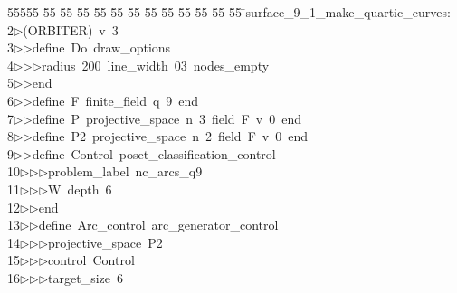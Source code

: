 %
%
\begin{tabbing}
55555 \= 55 \= 55 \= 55 \= 55 \= 55 \= 55 \= 55 \= 55 \= 55 \= 55 \= 55 \= 55 \= \>surface\_9\_1\_make\_quartic\_curves:\\[0pt]
2\>$\triangleright$\>(ORBITER)\ v\ 3\ \\[0pt]
3\>$\triangleright$\>$\triangleright$\>define\ Do\ draw\_options\ \\[0pt]
4\>$\triangleright$\>$\triangleright$\>$\triangleright$\>radius\ 200\ line\_width\ 03\ nodes\_empty\ \\[0pt]
5\>$\triangleright$\>$\triangleright$\>end\ \\[0pt]
6\>$\triangleright$\>$\triangleright$\>define\ F\ finite\_field\ q\ 9\ end\ \\[0pt]
7\>$\triangleright$\>$\triangleright$\>define\ P\ projective\_space\ n\ 3\ field\ F\ v\ 0\ end\ \\[0pt]
8\>$\triangleright$\>$\triangleright$\>define\ P2\ projective\_space\ n\ 2\ field\ F\ v\ 0\ end\ \\[0pt]
9\>$\triangleright$\>$\triangleright$\>define\ Control\ poset\_classification\_control\ \\[0pt]
10\>$\triangleright$\>$\triangleright$\>$\triangleright$\>problem\_label\ nc\_arcs\_q9\ \\[0pt]
11\>$\triangleright$\>$\triangleright$\>$\triangleright$\>W\ depth\ 6\ \\[0pt]
12\>$\triangleright$\>$\triangleright$\>end\ \\[0pt]
13\>$\triangleright$\>$\triangleright$\>define\ Arc\_control\ arc\_generator\_control\ \\[0pt]
14\>$\triangleright$\>$\triangleright$\>$\triangleright$\>projective\_space\ P2\ \\[0pt]
15\>$\triangleright$\>$\triangleright$\>$\triangleright$\>control\ Control\ \\[0pt]
16\>$\triangleright$\>$\triangleright$\>$\triangleright$\>target\_size\ 6\ \\[0pt]

\end{tabbing}
